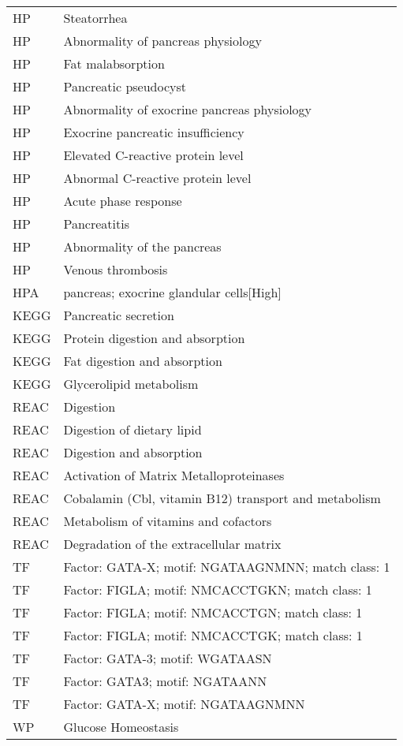 \begin{longtable}{ll}
HP & Steatorrhea\\
HP & Abnormality of pancreas physiology\\
HP & Fat malabsorption\\
HP & Pancreatic pseudocyst\\
HP & Abnormality of exocrine pancreas physiology\\
HP & Exocrine pancreatic insufficiency\\
HP & Elevated C-reactive protein level\\
HP & Abnormal C-reactive protein level\\
HP & Acute phase response\\
HP & Pancreatitis\\
HP & Abnormality of the pancreas\\
HP & Venous thrombosis\\
HPA & pancreas; exocrine glandular cells[High]\\
KEGG & Pancreatic secretion\\
KEGG & Protein digestion and absorption\\
KEGG & Fat digestion and absorption\\
KEGG & Glycerolipid metabolism\\
REAC & Digestion\\
REAC & Digestion of dietary lipid\\
REAC & Digestion and absorption\\
REAC & Activation of Matrix Metalloproteinases\\
REAC & Cobalamin (Cbl, vitamin B12) transport and metabolism\\
REAC & Metabolism of vitamins and cofactors\\
REAC & Degradation of the extracellular matrix\\
TF & Factor: GATA-X; motif: NGATAAGNMNN; match class: 1\\
TF & Factor: FIGLA; motif: NMCACCTGKN; match class: 1\\
TF & Factor: FIGLA; motif: NMCACCTGN; match class: 1\\
TF & Factor: FIGLA; motif: NMCACCTGK; match class: 1\\
TF & Factor: GATA-3; motif: WGATAASN\\
TF & Factor: GATA3; motif: NGATAANN\\
TF & Factor: GATA-X; motif: NGATAAGNMNN\\
WP & Glucose Homeostasis\\
\bottomrule
\end{longtable}

